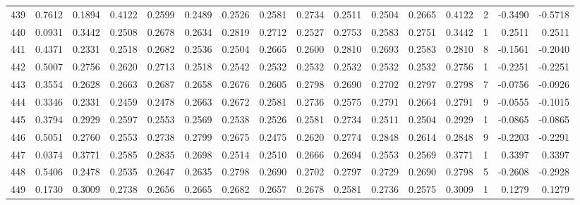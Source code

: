\begin{tabular}{lrrrrrrrrrrrrrrr}
439 &      0.7612 &  0.1894 &  0.4122 &  0.2599 &  0.2489 &  0.2526 &  0.2581 &  0.2734 &  0.2511 &  0.2504 &   0.2665 &     0.4122 &      2 &                   -0.3490 &                    -0.5718 \\
440 &      0.0931 &  0.3442 &  0.2508 &  0.2678 &  0.2634 &  0.2819 &  0.2712 &  0.2527 &  0.2753 &  0.2583 &   0.2751 &     0.3442 &      1 &                    0.2511 &                     0.2511 \\
441 &      0.4371 &  0.2331 &  0.2518 &  0.2682 &  0.2536 &  0.2504 &  0.2665 &  0.2600 &  0.2810 &  0.2693 &   0.2583 &     0.2810 &      8 &                   -0.1561 &                    -0.2040 \\
442 &      0.5007 &  0.2756 &  0.2620 &  0.2713 &  0.2518 &  0.2542 &  0.2532 &  0.2532 &  0.2532 &  0.2532 &   0.2532 &     0.2756 &      1 &                   -0.2251 &                    -0.2251 \\
443 &      0.3554 &  0.2628 &  0.2663 &  0.2687 &  0.2658 &  0.2676 &  0.2605 &  0.2798 &  0.2690 &  0.2702 &   0.2797 &     0.2798 &      7 &                   -0.0756 &                    -0.0926 \\
444 &      0.3346 &  0.2331 &  0.2459 &  0.2478 &  0.2663 &  0.2672 &  0.2581 &  0.2736 &  0.2575 &  0.2791 &   0.2664 &     0.2791 &      9 &                   -0.0555 &                    -0.1015 \\
445 &      0.3794 &  0.2929 &  0.2597 &  0.2553 &  0.2569 &  0.2538 &  0.2526 &  0.2581 &  0.2734 &  0.2511 &   0.2504 &     0.2929 &      1 &                   -0.0865 &                    -0.0865 \\
446 &      0.5051 &  0.2760 &  0.2553 &  0.2738 &  0.2799 &  0.2675 &  0.2475 &  0.2620 &  0.2774 &  0.2848 &   0.2614 &     0.2848 &      9 &                   -0.2203 &                    -0.2291 \\
447 &      0.0374 &  0.3771 &  0.2585 &  0.2835 &  0.2698 &  0.2514 &  0.2510 &  0.2666 &  0.2694 &  0.2553 &   0.2569 &     0.3771 &      1 &                    0.3397 &                     0.3397 \\
448 &      0.5406 &  0.2478 &  0.2535 &  0.2647 &  0.2635 &  0.2798 &  0.2690 &  0.2702 &  0.2797 &  0.2729 &   0.2690 &     0.2798 &      5 &                   -0.2608 &                    -0.2928 \\
449 &      0.1730 &  0.3009 &  0.2738 &  0.2656 &  0.2665 &  0.2682 &  0.2657 &  0.2678 &  0.2581 &  0.2736 &   0.2575 &     0.3009 &      1 &                    0.1279 &                     0.1279 \\

\end{tabular}
